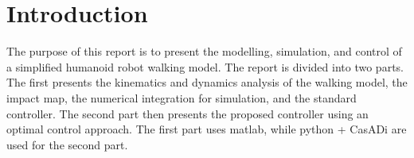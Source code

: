 \section{Introduction}
\label{sec:introduction}

The purpose of this report is to present the modelling, simulation, and control of a simplified humanoid robot walking model. The report is divided into two parts. The first presents the kinematics and dynamics analysis of the walking model, the impact map, the numerical integration for simulation, and the standard controller. The second part then presents the proposed controller using an optimal control approach. The first part uses matlab, while python + CasADi are used for the second part. 





